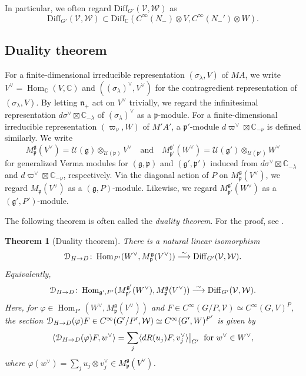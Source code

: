 \documentclass[reqno,11pt]{amsart}
\newtheorem{thm}[equation]{Theorem}
\theoremstyle{remark}
\theoremstyle{definition}
\numberwithin{equation}{section}
\newcommand{\fg}{{\mathfrak g}}
\newcommand{\fn}{{\mathfrak n}}
\newcommand{\fp}{{\mathfrak p}}
\newcommand{\C}{\mathbb{C}}
\newcommand{\Cal}{\mathcal}
\newcommand{\Hom}{\operatorname{Hom}}
\newcommand{\IP}[2]{\langle#1 , #2\rangle}     %
\newcommand{\To}{\longrightarrow}
\newcommand{\Diff}{\mathrm{Diff}}
\newcommand{\Mp}{M^{\fg}_{\fp}}
\newcommand{\Mpp}{M^{\fg'}_{\fp'}}
\newcommand{\EuD}{\EuScript{D}}
\begin{document}
\noindent
In particular, we often regard $\Diff_{G'}(\Cal{V},\Cal{W})$ as 
\begin{equation}\label{eqn:DN}
\Diff_{G'}(\Cal{V},\Cal{W}) \subset 
\Diff_\C(C^\infty(N_-)\otimes V, C^\infty(N_-')\otimes W).
\end{equation}


\subsection{Duality theorem}\label{sec:duality}

For a finite-dimensional irreducible representation $(\sigma_\lambda,V)$ of $MA$,
we write $V^\vee = \Hom_\C(V,\C)$ and $((\sigma_\lambda)^\vee, V^\vee)$ for
the contragredient representation of $(\sigma_\lambda,V)$. By letting $\fn_+$ act 
on $V^\vee$ trivially, we regard the infinitesimal representation 
$d\sigma^\vee \boxtimes \C_{-\lambda}$ of $(\sigma_\lambda)^\vee$ as a $\fp$-module. For a finite-dimensional irreducible representation 
$(\varpi_\nu, W)$ of $M'A'$, a $\fp'$-module 
$d\varpi^\vee \boxtimes \C_{-\nu}$ is defined similarly.
We write
\begin{equation*}
\Mp(V^\vee) = \Cal{U}(\fg)\otimes_{\Cal{U}(\fp)}V^\vee
\quad
\text{and}
\quad
\Mpp(W^\vee) = \Cal{U}(\fg')\otimes_{\Cal{U}(\fp')}W^\vee
\end{equation*}
for generalized Verma modules for $(\fg, \fp)$ and $(\fg',\fp')$ induced from 
$d\sigma^\vee \boxtimes \C_{-\lambda}$ and $d\varpi^\vee \boxtimes \C_{-\nu}$,
respectively.
Via the diagonal action of $P$ on $\Mp(V^\vee)$, we regard
$M_\fp(V^\vee)$ as a $(\fg, P)$-module. Likewise, we regard 
$\Mpp(W^\vee)$ as a $(\fg', P')$-module.


The following theorem is often called the \emph{duality theorem}. 
For the proof, see \cite{KP1}.

\begin{thm}[Duality theorem]\label{thm:duality}
There is a natural linear isomorphism
\begin{equation}\label{eqn:duality1}
\EuD_{H\to D}
\colon
\operatorname{Hom}_{P'}(W^\vee,\Mp(V^\vee))
\stackrel{\sim}{\To} 
\operatorname{Diff}_{G'}(\mathcal V, \mathcal W).
\end{equation}
Equivalently,
\begin{equation}\label{eqn:duality2}
\EuD_{H\to D}
\colon
\operatorname{Hom}_{\fg', P'}(\Mpp(W^\vee),\Mp(V^\vee))
\stackrel{\sim}{\To} 
\operatorname{Diff}_{G'}(\mathcal V, \mathcal W).
\end{equation}
Here,
for $\varphi \in \Hom_{P'}(W^\vee, \Mp(V^\vee))$ and
$F \in C^\infty(G/P,\Cal{V})\simeq C^\infty(G,V)^P$,
the section $\EuD_{H\to D}(\varphi)F \in C^\infty(G'/P',\Cal{W})\simeq C^\infty(G',W)^{P'}$
is given by 
\begin{equation}\label{eqn:HD}
\IP{\EuD_{H\to D}(\varphi)F}{w^\vee} =
\sum_{j}\IP{dR(u_j)F}{v_j^\vee}\big\vert_{G'}
\;\; \text{for $w^\vee \in W^\vee$},
\end{equation}
where $\varphi(w^\vee)=\sum_j u_j\otimes v_j^\vee \in \Mp(V^\vee)$.
\end{thm}
\end{document}
